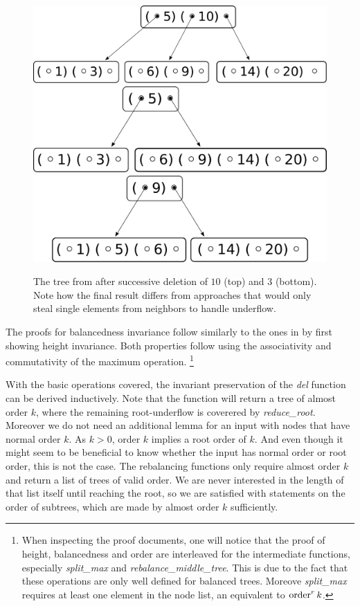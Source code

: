 \begin{figure}
    \centering
    \includegraphics[width=0.48\linewidth]{figures/btree-basic-ins9-ins1.pdf}
    \vspace*{1cm}
    \includegraphics[width=0.48\linewidth]{figures/btree-basic-ins9-ins1-del10.pdf}\\
    \vspace*{1cm}
    \includegraphics[width=0.48\linewidth]{figures/btree-basic-ins9-ins1-del10-del3.pdf}
    \caption[An example B-Tree after two deletion operations]{The tree from  after 
    successive deletion of $10$ (top) and $3$ (bottom).
    Note how the final result differs from approaches that would only steal single elements
    from neighbors to handle underflow.}
    \label{fig:btree-basic-del}
\end{figure}

The proofs for balancedness invariance follow similarly to
the ones in  by first showing height invariance.
Both properties follow using the associativity
and commutativity of the maximum operation.
\footnote{
    When inspecting the proof documents,
    one will notice that the proof of height, balancedness and order
    are interleaved for the
    intermediate functions, especially
    \textit{split\_max} and \textit{rebalance\_middle\_tree}.
    This is due to the fact that these operations
    are only well defined for balanced trees.
    Moreove \textit{split\_max} requires at least
    one element in the node list, an equivalent
    to $\operatorname{order}^r k$.
}

With the basic operations covered,
the invariant preservation of the \textit{del} function
can be derived inductively.
Note that the function will return a tree of almost order $k$,
where the remaining root-underflow is coverered by \textit{reduce\_root}.
Moreover we do not need an additional lemma
for an input with nodes that have normal order $k$.
As $k > 0$, order $k$ implies a root order of $k$.
And even though it might seem to be beneficial to know
whether the input has normal order or root order, this is not the case.
The rebalancing functions only require
almost order $k$ and return a list of trees of valid order.
We are never interested in the length of that list itself
until reaching the root, so we are satisfied with statements
on the order of subtrees,
which are made by almost order $k$ sufficiently.

